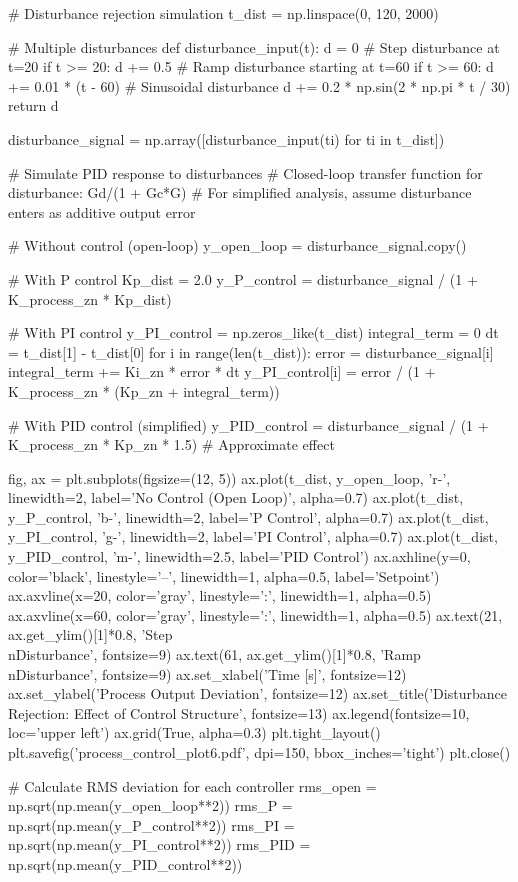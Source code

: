 \documentclass[11pt,a4paper]{article}
\begin{document}
\begin{pycode}
# Disturbance rejection simulation
t_dist = np.linspace(0, 120, 2000)

# Multiple disturbances
def disturbance_input(t):
    d = 0
    # Step disturbance at t=20
    if t >= 20:
        d += 0.5
    # Ramp disturbance starting at t=60
    if t >= 60:
        d += 0.01 * (t - 60)
    # Sinusoidal disturbance
    d += 0.2 * np.sin(2 * np.pi * t / 30)
    return d

disturbance_signal = np.array([disturbance_input(ti) for ti in t_dist])

# Simulate PID response to disturbances
# Closed-loop transfer function for disturbance: Gd/(1 + Gc*G)
# For simplified analysis, assume disturbance enters as additive output error

# Without control (open-loop)
y_open_loop = disturbance_signal.copy()

# With P control
Kp_dist = 2.0
y_P_control = disturbance_signal / (1 + K_process_zn * Kp_dist)

# With PI control
y_PI_control = np.zeros_like(t_dist)
integral_term = 0
dt = t_dist[1] - t_dist[0]
for i in range(len(t_dist)):
    error = disturbance_signal[i]
    integral_term += Ki_zn * error * dt
    y_PI_control[i] = error / (1 + K_process_zn * (Kp_zn + integral_term))

# With PID control (simplified)
y_PID_control = disturbance_signal / (1 + K_process_zn * Kp_zn * 1.5)  # Approximate effect

fig, ax = plt.subplots(figsize=(12, 5))
ax.plot(t_dist, y_open_loop, 'r-', linewidth=2, label='No Control (Open Loop)', alpha=0.7)
ax.plot(t_dist, y_P_control, 'b-', linewidth=2, label='P Control', alpha=0.7)
ax.plot(t_dist, y_PI_control, 'g-', linewidth=2, label='PI Control', alpha=0.7)
ax.plot(t_dist, y_PID_control, 'm-', linewidth=2.5, label='PID Control')
ax.axhline(y=0, color='black', linestyle='--', linewidth=1, alpha=0.5, label='Setpoint')
ax.axvline(x=20, color='gray', linestyle=':', linewidth=1, alpha=0.5)
ax.axvline(x=60, color='gray', linestyle=':', linewidth=1, alpha=0.5)
ax.text(21, ax.get_ylim()[1]*0.8, 'Step\\nDisturbance', fontsize=9)
ax.text(61, ax.get_ylim()[1]*0.8, 'Ramp\\nDisturbance', fontsize=9)
ax.set_xlabel('Time [s]', fontsize=12)
ax.set_ylabel('Process Output Deviation', fontsize=12)
ax.set_title('Disturbance Rejection: Effect of Control Structure', fontsize=13)
ax.legend(fontsize=10, loc='upper left')
ax.grid(True, alpha=0.3)
plt.tight_layout()
plt.savefig('process_control_plot6.pdf', dpi=150, bbox_inches='tight')
plt.close()

# Calculate RMS deviation for each controller
rms_open = np.sqrt(np.mean(y_open_loop**2))
rms_P = np.sqrt(np.mean(y_P_control**2))
rms_PI = np.sqrt(np.mean(y_PI_control**2))
rms_PID = np.sqrt(np.mean(y_PID_control**2))
\end{pycode}
\end{document}
